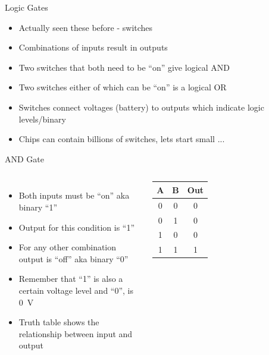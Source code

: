 \documentclass{beamer}
\begin{document}
\begin{frame}{Logic Gates}
  \begin{itemize}
  \item
    Actually seen these before - switches
  \item
    Combinations of inputs result in outputs
  \item
    Two switches that both need to be ``on'' give logical AND
  \item
    Two switches either of which can be ``on'' is a logical OR
  \item
    Switches connect voltages (battery) to outputs which indicate logic levels/binary
  \item
    Chips can contain billions of switches, lets start small ...
  \end{itemize}
\end{frame}


\begin{frame}{AND Gate}
  \begin{columns}
    \begin{itemize}
    \item
      Both inputs must be ``on'' aka binary ``1''
    \item
      Output for this condition is ``1''
    \item
      For any other combination output is ``off'' aka binary ``0''
    \item
      Remember that ``1'' is also a certain voltage level and ``0'', is \SI{0}{\volt}
    \item
      Truth table shows the relationship between input and output
    \end{itemize}

    \begin{tabular}{ccc}
      \hline
      \textbf{A} & \textbf{B} & \textbf{Out} \\
      \hline
      0 & 0 & 0 \\
      0 & 1 & 0 \\
      1 & 0 & 0 \\
      1 & 1 & 1 \\
      \hline
    \end{tabular}    
  \end{columns}    
\end{frame}
\end{document}

